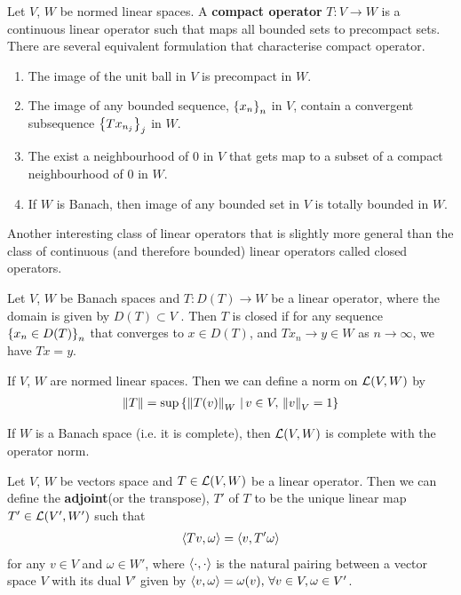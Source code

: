 \documentclass{article}
\begin{document}
\begin{fdefinition} \label{def: compact operator}Let $V$, $W$ be normed linear spaces. A \textbf{compact operator} $T: V \to W$ is a continuous linear operator such that maps all bounded sets to precompact sets. \\

There are several equivalent formulation that characterise compact operator. 
\begin{enumerate}
\item The image of the unit ball in $V$ is precompact in $W$. 
\item The image of any bounded sequence, $\set{x_n}_n$ in $V$, contain a convergent subsequence $\set{Tx_{n_j}}_j$ in $W$.
\item The exist a neighbourhood of 0 in $V$ that gets map to a subset of a compact neighbourhood of 0 in $W$. 
\item If $W$ is Banach, then image of any bounded set in $V$ is totally bounded in $W$. 
\end{enumerate}
\end{fdefinition}


Another interesting class of linear operators that is slightly more general than the class of continuous (and therefore bounded) linear operators called closed operators. 
\begin{fdefinition} Let $V$, $W$ be Banach spaces and $T: D(T) \to W$ be a linear operator, where the domain is given by $D(T) \subset V$ . Then $T$ is closed if for any sequence $\set{x_n \in D(T)}_n$ that converges to $x \in D(T)$, and $Tx_n \to y \in W$ as $n \to \infty$, we have $Tx = y$. 
\end{fdefinition}

\begin{fdefinition} If $V$, $W$ are normed linear spaces. Then we can define a norm on $\L(V, W)$ by 
\begin{align*}
\norm[T] = \sup \set{ \norm[T(v)]_W \wh v \in V, \, \norm[v]_V = 1}
\end{align*}
\end{fdefinition}


\begin{ftheorem}[Completeness of $\L(V, W)$] If $W$ is a Banach space (i.e. it is complete), then $\L(V, W)$ is complete with the operator norm. 
\end{ftheorem}

\begin{fdefinition}[Adjoint] Let $V$, $W$ be vectors space and $T \in \L(V, W)$ be a linear operator. Then we can define the \textbf{adjoint}(or the transpose), $T'$ of $T$ to be the unique linear map $T' \in \L(V', W')$ such that 
\begin{align*}
\inprod[Tv, \omega] = \inprod[v, T'\omega]
\end{align*}
for any $v \in V$ and $\omega \in W'$, where $\inprod$ is the natural pairing between a vector space $V$ with its dual $V'$ given by $\inprod[v, \omega] = \omega(v), \, \forall v \in V, \omega \in V'$. 
\end{fdefinition}
\end{document}
